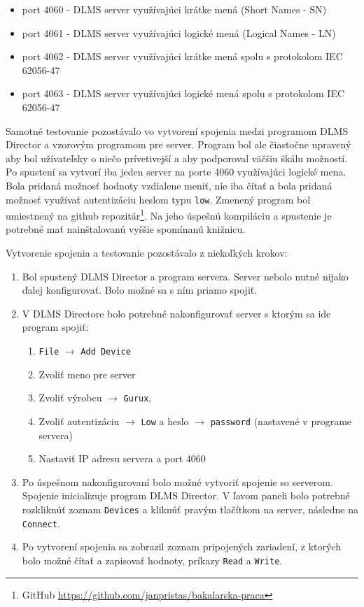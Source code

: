 \begin{itemize}
\item port 4060 - DLMS server využívajúci krátke mená (Short Names - SN)
\item port 4061 - DLMS server využívajúci logické mená (Logical Names - LN) 
\item port 4062 - DLMS server využívajúci krátke mená spolu s protokolom IEC 62056-47
\item port 4063 - DLMS server využívajúci logické mená spolu s protokolom IEC 62056-47
\end{itemize} \par
Samotné testovanie pozostávalo vo vytvorení spojenia medzi programom DLMS Director a vzorovým programom pre server. Program bol ale čiastočne upravený aby bol užívateľsky o niečo prívetivejší a aby podporoval väčšiu škálu možností. Po spustení sa vytvorí iba jeden server na porte 4060 využívajúci logické mena. Bola pridaná možnosť hodnoty vzdialene meniť, nie iba čítať a bola pridaná možnosť využívať autentizáciu heslom typu {\tt low}. Zmenený program bol umiestnený na github repozitár\footnote{GitHub \url{https://github.com/janpristas/bakalarska-praca}}. Na jeho úspešnú kompiláciu a spustenie je potrebné mať nainštalovanú vyššie spomínanú knižnicu. \par
Vytvorenie spojenia a testovanie pozostávalo z niekoľkých krokov:
\begin{enumerate}
\item Bol spustený DLMS Director a program servera. Server nebolo nutné nijako ďalej konfigurovať. Bolo možné sa s ním priamo spojiť.
\item V DLMS Directore bolo potrebné nakonfigurovať server s ktorým sa ide program spojiť:
\begin{enumerate}
\item {\tt File} $\rightarrow$ {\tt Add Device}
\item Zvoliť meno pre server
\item Zvoliť výrobcu $\rightarrow$ {\tt Gurux}, 
\item Zvoliť autentizáciu $\rightarrow$ {\tt Low} a heslo $\rightarrow$ {\tt password} (nastavené v programe servera)
\item Nastaviť IP adresu servera a port 4060
\end{enumerate}
\item Po úspešnom nakonfigurovaní bolo možné vytvoriť spojenie so serverom. Spojenie inicializuje program DLMS Director. V ľavom paneli bolo potrebné rozkliknúť zoznam {\tt Devices} a kliknúť pravým tlačítkom na server, následne na {\tt Connect}.
\item Po vytvorení spojenia sa zobrazil zoznam pripojených zariadení, z ktorých bolo možné čítať a zapisovať hodnoty, príkazy {\tt Read} a {\tt Write}.
\end{enumerate} \par
